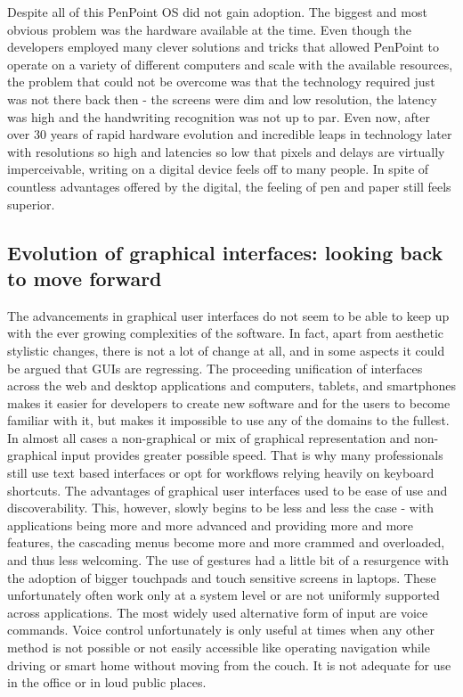 Despite all of this PenPoint OS did not gain adoption. The biggest and most
obvious problem was the hardware available at the time. Even though the
developers employed many clever solutions and tricks that allowed PenPoint to
operate on a variety of different computers and scale with the available
resources, the problem that could not be overcome was that the technology
required just was not there back then - the screens were dim and low resolution,
the latency was high and the handwriting recognition was not up to par. Even
now, after over 30 years of rapid hardware evolution and incredible leaps in
technology later with resolutions so high and latencies so low that pixels and
delays are virtually imperceivable, writing on a digital device feels off to
many people. In spite of countless advantages offered by the digital, the
feeling of pen and paper still feels superior.

\subsection{Evolution of graphical interfaces: looking back to move forward}

The advancements in graphical user interfaces do not seem to be able to keep up
with the ever growing complexities of the software. In fact, apart from
aesthetic stylistic changes, there is not a lot of change at all, and in some
aspects it could be argued that GUIs are regressing. The proceeding unification
of interfaces across the web and desktop applications and computers, tablets,
and smartphones makes it easier for developers to create new software and for
the users to become familiar with it, but makes it impossible to use any of the
domains to the fullest. In almost all cases a non-graphical or mix of graphical
representation and non-graphical input provides greater possible speed. That is
why many professionals still use text based interfaces or opt for workflows
relying heavily on keyboard shortcuts. The advantages of graphical user
interfaces used to be ease of use and discoverability. This, however, slowly
begins to be less and less the case - with applications being more and more
advanced and providing more and more features, the cascading menus become more
and more crammed and overloaded, and thus less welcoming. The use of gestures
had a little bit of a resurgence with the adoption of bigger touchpads and
touch sensitive screens in laptops. These unfortunately often work only at
a system level or are not uniformly supported across applications. The most
widely used alternative form of input are voice commands. Voice control
unfortunately is only useful at times when any other method is not possible or
not easily accessible like operating navigation while driving or smart home
without moving from the couch. It is not adequate for use in the office or in
loud public places.

